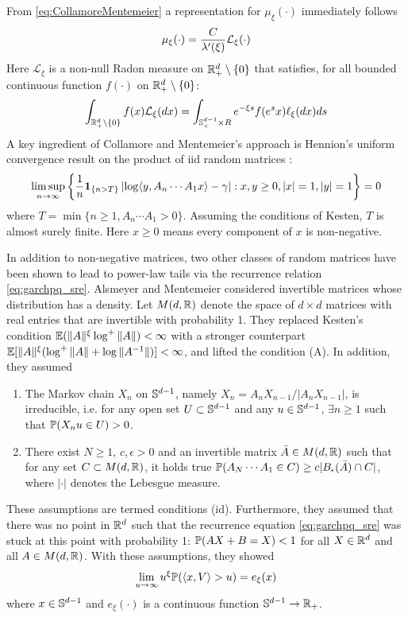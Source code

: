 \documentclass[aoas,preprint]{imsart}
\numberwithin{equation}{section}
\theoremstyle{plain}
\begin{document}
From \eqref{eq:CollamoreMentemeier} a representation for
$\mu_\xi (\cdot)$ immediately follows 
\[
\mu_\xi (\cdot) = {C \over \lambda'(\xi)} \mathcal L_\xi(\cdot)
\]
Here $\mathcal L_\xi$ is a non-null Radon measure  on
$\reals^d_+ \setminus \{0\}$ that satisfies, for all
bounded continuous function $f(\cdot)$ on
$\reals_+^{d} \setminus \{0\}$:
\[
\int_{\reals_+^d\setminus \{0\}} f(x) \mathcal L_\xi(dx)
=
\int_{\sphere^{d-1}_+ \times R} e^{-\xi s} f(e^s x) \ell_\xi(dx) ds
\]
A key ingredient of Collamore and Mentemeier's approach is Hennion's
uniform convergence result on the product of iid random matrices
\cite{hennion:1997}:
\[
\limsup_{n \to \infty}
\left\{
  {1 \over n} \1{n > T}
  \left|
  \log \inn{y, A_n \cdots A_1 x} - \gamma
  \right|
  :
  x, y \geq 0, |x| = 1, |y| = 1
  \right\} = 0
\]
where $T = \min\{n \geq 1, A_n \cdots A_1 > 0\}$. Assuming the
conditions of Kesten, $T$ is almost surely finite. Here
$x \geq 0$ means every component of $x$ is non-negative.

In addition to non-negative matrices, two other classes of random
matrices have been shown to lead to power-law tails via the recurrence
relation \eqref{eq:garchpq_sre}. Alsmeyer and Mentemeier
\cite{alsmeyer:mentemeier:2012} considered invertible matrices whose
distribution has a density. Let $M(d, \reals)$ denote the space of
$d \times d$ matrices with real entries that are invertible with
probability 1. They replaced Kesten's condition
$\E (\|A\|^\xi \log^+\|A\|) < \infty$ with a stronger
counterpart
$\E [\|A\|^\xi (\log^+\|A\| + \log \|A^{-1} \|)] < \infty$,
and lifted the condition (A). In addition, they assumed
\begin{enumerate}
  \item The Markov chain $X_n$ on $\sphere^{d-1}$, namely
    $X_n = A_n X_{n-1} / |A_n X_{n-1}|$, is irreducible, i.e. for any open
    set $U \subset \sphere^{d-1}$ and any $u \in \sphere^{d-1}$, 
    $\exists n \geq 1$ such that $\P(X_n u \in U) > 0$.
  \item There exist $N \geq 1$, $c, \epsilon > 0$ and an invertible
    matrix $\bar A \in M(d, \reals)$ such that for any set
    $C \subset M(d, \reals)$, it holds true
    $\P(A_N \cdots A_1 \in C) \geq c |B_\epsilon(\bar A) \cap C|$,
    where $|\cdot|$ denotes the Lebesgue measure.
\end{enumerate}
These assumptions are termed conditions (id). Furthermore, they assumed
that there was no point in $\reals^d$ such that the recurrence
equation \eqref{eq:garchpq_sre} was stuck at this point with probability 1: 
$\P(A X + B = X) < 1$ for all $X \in \reals^d$ and all $A \in M(d, \reals)$.
With these assumptions, they showed
\[
\lim_{u \to \infty} u^\xi \P(\inn{x, V} > u) = e_\xi(x)
\]
where $x \in \sphere^{d - 1}$ and $e_\xi(\cdot)$ is a continuous
function $\sphere^{d-1} \to \reals_+$.
\end{document}
